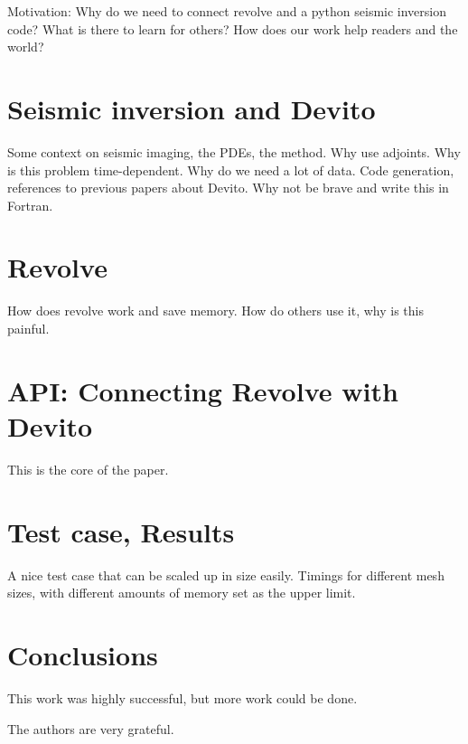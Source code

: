 \documentclass[sigconf]{acmart}
\begin{document}
Motivation: Why do we need to connect revolve and a python seismic inversion code? What is there to learn for others? How does our work help readers and the world?

\section{Seismic inversion and Devito}
\label{sec:inversion_devito}
Some context on seismic imaging, the PDEs, the method. Why use
adjoints. Why is this problem time-dependent. Why do we need a lot of
data.
Code generation, references to previous papers about Devito. Why not
be brave and write this in Fortran.

\section{Revolve}
\label{sec:revolve}
How does revolve work and save memory. How do others use it, why is this painful.

\section{API: Connecting Revolve with Devito}
\label{sec:api}
This is the core of the paper.

\section{Test case, Results}
\label{sec:experiment}
A nice test case that can be scaled up in size easily. Timings for different mesh sizes, with different amounts of memory set as the upper limit.

\section{Conclusions}
This work was highly successful, but more work could be done.

\begin{acks}
  The authors are very grateful.
\end{acks}



 
\end{document}
